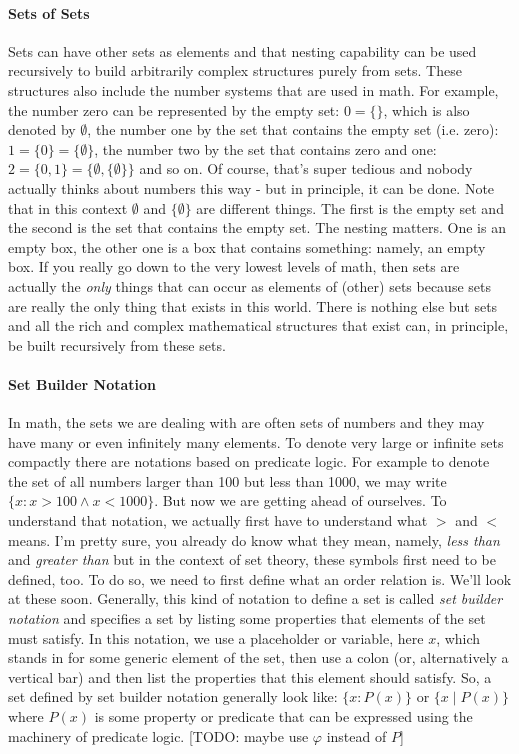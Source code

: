 \paragraph{Sets of Sets}
Sets can have other sets as elements and that nesting capability can be used recursively to build arbitrarily complex structures purely from sets. These structures also include the number systems that are used in math. For example, the number zero can be represented by the empty set: $0 = \{\}$, which is also denoted by $\emptyset$, the number one by the set that contains the empty set (i.e. zero): $1 = \{ 0 \} =  \{ \emptyset \}$, the number two by the set that contains zero and one: $2 = \{ 0, 1 \} = \{ \emptyset, \{ \emptyset \} \}$ and so on. Of course, that's super tedious and nobody actually thinks about numbers this way - but in principle, it can be done. Note that in this context $\emptyset$ and $\{ \emptyset \}$ are different things. The first is the empty set and the second is the set that contains the empty set. The nesting matters. One is an empty box, the other one is a box that contains something: namely, an empty box. If you really go down to the very lowest levels of math, then sets are actually the \emph{only} things that can occur as elements of (other) sets because sets are really the only thing that exists in this world. There is nothing else but sets and all the rich and complex mathematical structures that exist can, in principle, be built recursively from these sets. 

\paragraph{Set Builder Notation}
In math, the sets we are dealing with are often sets of numbers and they may have many or even infinitely many elements. To denote very large or infinite sets compactly there are notations based on predicate logic. For example to denote the set of all numbers larger than 100 but less than 1000, we may write $\{x : x > 100 \wedge x < 1000\}$. But now we are getting ahead of ourselves. To understand that notation, we actually first have to understand what $>$ and $<$ means. I'm pretty sure, you already do know what they mean, namely, \emph{less than} and \emph{greater than} but in the context of set theory, these symbols first need to be defined, too. To do so, we need to first define what an order relation is. We'll look at these soon. Generally, this kind of notation to define a set is called \emph{set builder notation} and specifies a set by listing some properties that elements of the set must satisfy. In this notation, we use a placeholder or variable, here $x$, which stands in for some generic element of the set, then use a colon (or, alternatively a vertical bar) and then list the properties that this element should satisfy. So, a set defined by set builder notation generally look like: $\{x : P(x)\}$ or  $\{x \; | \; P(x)\}$ where $P(x)$ is some property or predicate that can be expressed using the machinery of predicate logic. [TODO: maybe use $\varphi$ instead of $P$]

